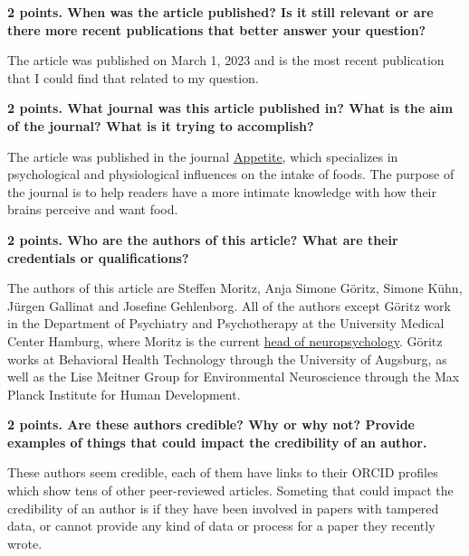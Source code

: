 \documentclass[title={Credible Sources - Literature Review and Article Selection},points={30}]{fdsn201homework}
\let\oldhref\href
\renewcommand{\href}[2]{\oldhref{#1}{\underline{#2}}}
\begin{document}
\begin{problems}
	\begin{answer}%
		\nocite{MORITZ2023106431}%
		\printbibliography[heading=none]
	\end{answer}
	\item \textbf{2 points. When was the article published?
	Is it still relevant or are there more recent publications that better answer your question?}
	\begin{answer}%
		The article was published on March 1, 2023 and is the most recent publication that I could find that related to my question.
	\end{answer}
	\item \textbf{2 points. What journal was this article published in?
	What is the aim of the journal?
	What is it trying to accomplish?}%
	\begin{answer}%
		The article was published in the journal \href{https://www.sciencedirect.com/journal/appetite}{Appetite}, which specializes in psychological and physiological influences on the intake of foods.
		The purpose of the journal is to help readers have a more intimate knowledge with how their brains perceive and want food.
	\end{answer}
	\item \textbf{2 points. Who are the authors of this article?
	What are their credentials or qualifications?}
	\begin{answer}%
		The authors of this article are Steffen Moritz, Anja Simone Göritz, Simone Kühn, Jürgen Gallinat and Josefine Gehlenborg.
		All of the authors except Göritz work in the Department of Psychiatry and Psychotherapy at the University Medical Center Hamburg, where Moritz is the current \href{https://orcid.org/0000-0001-8601-0143}{head of neuropsychology}.
		Göritz works at Behavioral Health Technology through the University of Augsburg, as well as the Lise Meitner Group for Environmental Neuroscience through the Max Planck Institute for Human Development.
	\end{answer}
	\item \textbf{2 points. Are these authors credible?
	Why or why not?
	Provide examples of things that could impact the credibility of an author.}
	\begin{answer}%
		These authors seem credible, each of them have links to their ORCID profiles which show tens of other peer-reviewed articles.
		Someting that could impact the credibility of an author is if they have been involved in papers with tampered data, or cannot provide any kind of data or process for a paper they recently wrote.

\end{answer}
\end{problems}
\end{document}
